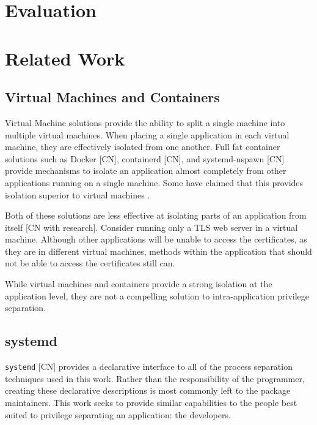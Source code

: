 \documentclass[sigplan]{acmart}
\begin{document}
\section{Evaluation}


\section{Related Work}

\subsection{Virtual Machines and Containers}

Virtual Machine solutions \citep{barham_xen_2003,vmware_inc_understanding_2008} provide the ability to split a single machine into multiple virtual machines. When placing a single application in each virtual machine, they are effectively isolated from one another. Full fat container solutions such as Docker [CN], containerd [CN], and systemd-nspawn [CN] provide mechanisms to isolate an application almost completely from other applications running on a single machine. Some have claimed that this provides isolation superior to virtual machines \citep{soltesz_container-based_2007}.

Both of these solutions are less effective at isolating parts of an application from itself [CN with research]. Consider running only a TLS web server in a virtual machine. Although other applications will be unable to access the certificates, as they are in different virtual machines, methods within the application that should not be able to access the certificates still can.

While virtual machines and containers provide a strong isolation at the application level, they are not a compelling solution to intra-application privilege separation.

\subsection{systemd}

\texttt{systemd} [CN] provides a declarative interface to all of the process separation techniques used in this work. Rather than the responsibility of the programmer, creating these declarative descriptions is most commonly left to the package maintainers. This work seeks to provide similar capabilities to the people best suited to privilege separating an application: the developers.
\end{document}
